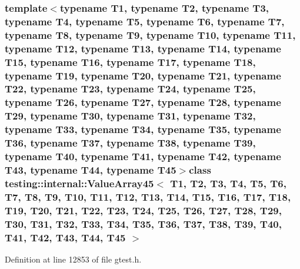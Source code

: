 \subsubsection*{template$<$typename T1, typename T2, typename T3, typename T4, typename T5, typename T6, typename T7, typename T8, typename T9, typename T10, typename T11, typename T12, typename T13, typename T14, typename T15, typename T16, typename T17, typename T18, typename T19, typename T20, typename T21, typename T22, typename T23, typename T24, typename T25, typename T26, typename T27, typename T28, typename T29, typename T30, typename T31, typename T32, typename T33, typename T34, typename T35, typename T36, typename T37, typename T38, typename T39, typename T40, typename T41, typename T42, typename T43, typename T44, typename T45$>$class testing\-::internal\-::\-Value\-Array45$<$ T1, T2, T3, T4, T5, T6, T7, T8, T9, T10, T11, T12, T13, T14, T15, T16, T17, T18, T19, T20, T21, T22, T23, T24, T25, T26, T27, T28, T29, T30, T31, T32, T33, T34, T35, T36, T37, T38, T39, T40, T41, T42, T43, T44, T45 $>$}



\-Definition at line 12853 of file gtest.\-h.



